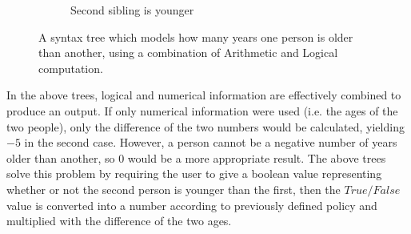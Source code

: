 \documentclass{article}
\begin{document}
\begin{figure}[H]
\begin{subfigure}{1.0\textwidth}
  \end{subfigure}
    
  \begin{subfigure}{1.0\textwidth}
  \centering
  
  
    \caption{Second sibling is younger}
    
  \end{subfigure}
  
 \caption{A syntax tree which models how many years one person is older than another, using a combination of Arithmetic and Logical computation.} 
 \end{figure}
 
 
 In the above trees, logical and numerical information are effectively combined to produce an output. If only numerical information were used (i.e. the ages of the two people), only the difference of the two numbers would be calculated, yielding $-5$ in the second case. However, a person cannot be a negative number of years older than another, so $0$ would be a more appropriate result. The above trees solve this problem by requiring the user to give a boolean value representing whether or not the second person is younger than the first, then the $True/False$ value is converted into a number according to previously defined policy and multiplied with the difference of the two ages. \\
 
\end{document}
